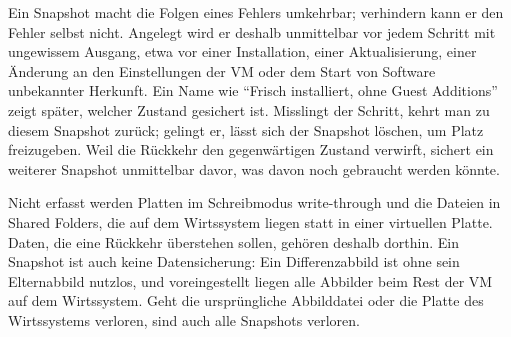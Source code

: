 Ein Snapshot macht die Folgen eines Fehlers umkehrbar; verhindern kann er den Fehler selbst nicht. Angelegt wird er deshalb unmittelbar vor jedem Schritt mit ungewissem Ausgang, etwa vor einer Installation, einer Aktualisierung, einer Änderung an den Einstellungen der VM oder dem Start von Software unbekannter Herkunft. Ein Name wie \enquote{Frisch installiert, ohne Guest Additions} zeigt später, welcher Zustand gesichert ist. Misslingt der Schritt, kehrt man zu diesem Snapshot zurück; gelingt er, lässt sich der Snapshot löschen, um Platz freizugeben. Weil die Rückkehr den gegenwärtigen Zustand verwirft, sichert ein weiterer Snapshot unmittelbar davor, was davon noch gebraucht werden könnte.

Nicht erfasst werden Platten im Schreibmodus write-through und die Dateien in Shared Folders, die auf dem Wirtssystem liegen statt in einer virtuellen Platte. Daten, die eine Rückkehr überstehen sollen, gehören deshalb dorthin. Ein Snapshot ist auch keine Datensicherung: Ein Differenzabbild ist ohne sein Elternabbild nutzlos, und voreingestellt liegen alle Abbilder beim Rest der VM auf dem Wirtssystem. Geht die ursprüngliche Abbilddatei oder die Platte des Wirtssystems verloren, sind auch alle Snapshots verloren.

